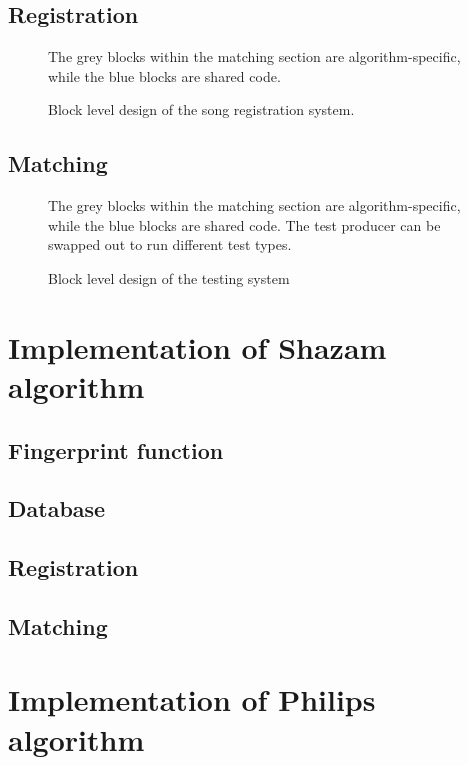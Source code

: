 \documentclass[12pt,a4paper,twoside,openright]{report}
\begin{document}
\subsection{Registration}

\begin{figure}[h]
  \centering
  
  \caption{Block level design of the song registration system.}
  \medskip \small
  The grey blocks within the matching section are algorithm-specific, while the blue blocks are shared code.
\end{figure}


\subsection{Matching}

\begin{figure}[h]
  \centering
  
  \caption{Block level design of the testing system}
  \medskip \small
  The grey blocks within the matching section are algorithm-specific, while the blue blocks are shared code. The test producer can be swapped out to run different test types.
\end{figure}


\section{Implementation of Shazam algorithm}
\label{section:shazam}

\subsection{Fingerprint function}
\subsection{Database}
\subsection{Registration}
\subsection{Matching}

\section{Implementation of Philips algorithm}
\label{section:philips}
\end{document}
